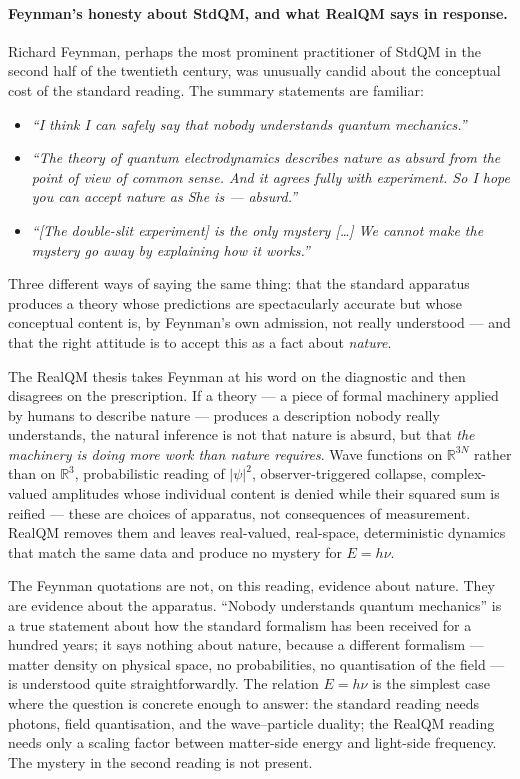 \paragraph{Feynman's honesty about StdQM, and what RealQM says in response.}
Richard Feynman, perhaps the most prominent practitioner of StdQM in the second half of the twentieth century, was unusually candid about the conceptual cost of the standard reading. The summary statements are familiar:
\begin{itemize}
\item \emph{``I think I can safely say that nobody understands quantum mechanics.''}~\cite{Feynman1965Character}
\item \emph{``The theory of quantum electrodynamics describes nature as absurd from the point of view of common sense. And it agrees fully with experiment. So I hope you can accept nature as She is --- absurd.''}~\cite{FeynmanQED1985}
\item \emph{``[The double-slit experiment] is the only mystery [\ldots] We cannot make the mystery go away by explaining how it works.''}~\cite{FeynmanLectures3}
\end{itemize}
Three different ways of saying the same thing: that the standard apparatus produces a theory whose predictions are spectacularly accurate but whose conceptual content is, by Feynman's own admission, not really understood --- and that the right attitude is to accept this as a fact about \emph{nature}.

The RealQM thesis takes Feynman at his word on the diagnostic and then disagrees on the prescription. If a theory --- a piece of formal machinery applied by humans to describe nature --- produces a description nobody really understands, the natural inference is not that nature is absurd, but that \emph{the machinery is doing more work than nature requires}. Wave functions on $\mathbb{R}^{3N}$ rather than on $\mathbb{R}^3$, probabilistic reading of $|\psi|^2$, observer-triggered collapse, complex-valued amplitudes whose individual content is denied while their squared sum is reified --- these are choices of apparatus, not consequences of measurement. RealQM removes them and leaves real-valued, real-space, deterministic dynamics that match the same data and produce no mystery for $E = h\nu$.

The Feynman quotations are not, on this reading, evidence about nature. They are evidence about the apparatus. ``Nobody understands quantum mechanics'' is a true statement about how the standard formalism has been received for a hundred years; it says nothing about nature, because a different formalism --- matter density on physical space, no probabilities, no quantisation of the field --- is understood quite straightforwardly. The relation $E = h\nu$ is the simplest case where the question is concrete enough to answer: the standard reading needs photons, field quantisation, and the wave--particle duality; the RealQM reading needs only a scaling factor between matter-side energy and light-side frequency. The mystery in the second reading is not present.

